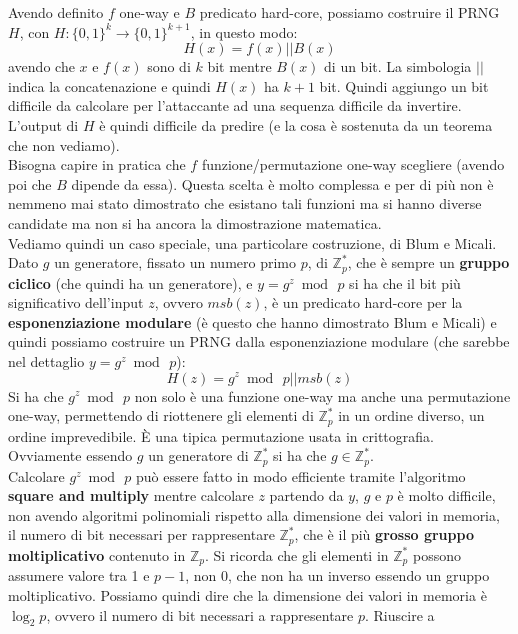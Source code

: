 \documentclass[a4paper,12pt, oneside]{book}
\begin{document}
Avendo definito $f$ one-way e $B$ predicato hard-core, possiamo costruire il
PRNG $H$, con $H:\{0,1\}^k\to\{0,1\}^{k+1}$, in questo modo:
\[H(x)=f(x)||B(x)\]
avendo che $x$ e $f(x)$ sono di $k$ bit mentre $B(x)$ di un bit. La simbologia
$||$ indica la concatenazione e quindi $H(x)$ ha $k+1$ bit. Quindi aggiungo un
bit difficile da calcolare per l'attaccante ad una sequenza difficile da
invertire. L'output di $H$ è quindi difficile da predire (e la cosa è sostenuta
da un teorema che non vediamo).\\
Bisogna capire in pratica che $f$ funzione/permutazione one-way
scegliere (avendo poi che $B$ dipende da essa). Questa scelta è molto complessa
e per di più non è nemmeno mai stato 
dimostrato che esistano tali funzioni ma si hanno diverse candidate ma non si ha
ancora la dimostrazione matematica.\\
Vediamo quindi un caso speciale, una particolare costruzione, di Blum e
Micali.\\ 
Dato $g$ un generatore, fissato un numero primo $p$, di $\mathbb{Z}_p^*$, che è
sempre un \textbf{gruppo ciclico} (che quindi ha un generatore), e
$y=g^z\bmod\,p$ si ha che il bit più 
significativo dell'input $z$, ovvero $msb(z)$, è un predicato hard-core per la
\textbf{esponenziazione modulare} (è questo che hanno dimostrato Blum e Micali)
e quindi possiamo costruire un PRNG dalla 
esponenziazione modulare (che sarebbe nel dettaglio $y=g^z\bmod\,p$):
\[H(z)=g^z\bmod\,p||msb(z)\]
Si ha che $g^z\bmod\,p$ non solo è una funzione one-way ma anche una
permutazione one-way, permettendo di riottenere gli elementi di
$\mathbb{Z}_p^*$ in un ordine diverso, un ordine imprevedibile. È una tipica
permutazione usata in crittografia.\\
Ovviamente essendo $g$ un generatore di $\mathbb{Z}_p^*$ si ha che
$g\in\mathbb{Z}_p^*$.\\
Calcolare $g^z\bmod\,p$ può essere fatto in modo efficiente tramite
l'algoritmo \textbf{square and multiply} mentre calcolare $z$ partendo da $y$,
$g$ e $p$ è molto difficile, non avendo algoritmi polinomiali rispetto alla
dimensione dei valori in memoria, il numero di bit necessari per rappresentare
$\mathbb{Z}_p^*$, che è il più \textbf{grosso gruppo moltiplicativo} contenuto
in $\mathbb{Z}_p$. Si ricorda che gli elementi in $\mathbb{Z}_p^*$ possono 
assumere valore tra 1 e $p-1$, non 0, che non ha un inverso essendo un gruppo
moltiplicativo. Possiamo quindi dire che la dimensione dei valori in memoria è
$\log_2 p$, ovvero il numero di bit necessari a rappresentare $p$. Riuscire a
\end{document}
